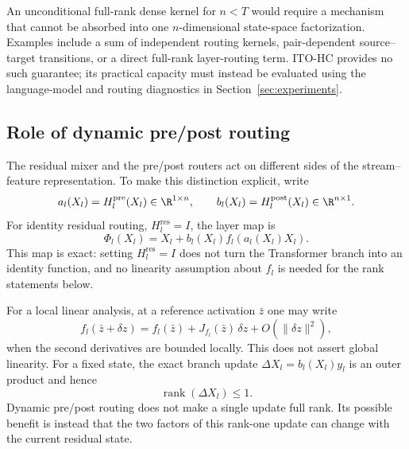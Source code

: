 \documentclass{article}
\newcommand{\Hpre}{H^{\mathrm{pre}}}
\newcommand{\Hpost}{H^{\mathrm{post}}}
\newcommand{\Hres}{H^{\mathrm{res}}}
\begin{document}
An unconditional full-rank dense kernel for $n<T$ would require a mechanism that cannot be absorbed into one $n$-dimensional state-space factorization. Examples include a sum of independent routing kernels, pair-dependent source--target transitions, or a direct full-rank layer-routing term. ITO-HC provides no such guarantee; its practical capacity must instead be evaluated using the language-model and routing diagnostics in Section~\ref{sec:experiments}.

\subsection{Role of dynamic pre/post routing}
\label{sec:dynamic-pre-post}

The residual mixer and the pre/post routers act on different sides of the stream--feature representation. To make this distinction explicit, write
\begin{equation}
 a_l(X_l)=\Hpre_l(X_l)\in\R^{1\times n},\qquad
 b_l(X_l)=\Hpost_l(X_l)\in\R^{n\times 1}.
 \label{eq:dynamic-ab}
\end{equation}
For identity residual routing, $\Hres_l=I$, the layer map is
\begin{equation}
 \Phi_l(X_l)=X_l+b_l(X_l)f_l\!\left(a_l(X_l)X_l\right).
 \label{eq:identity-dynamic-map}
\end{equation}
This map is exact: setting $\Hres_l=I$ does not turn the Transformer branch into an identity function, and no linearity assumption about $f_l$ is needed for the rank statements below.

For a local linear analysis, at a reference activation $\bar z$ one may write
\begin{equation}
 f_l(\bar z+\delta z)=f_l(\bar z)+J_{f_l}(\bar z)\,\delta z+O(\|\delta z\|^2),
 \label{eq:local-linear-branch}
\end{equation}
when the second derivatives are bounded locally. This does not assert global linearity. For a fixed state, the exact branch update $\Delta X_l=b_l(X_l)y_l$ is an outer product and hence
\begin{equation}
 \operatorname{rank}(\Delta X_l)\leq1.
 \label{eq:single-branch-rank}
\end{equation}
Dynamic pre/post routing does not make a single update full rank. Its possible benefit is instead that the two factors of this rank-one update can change with the current residual state.
\end{document}
